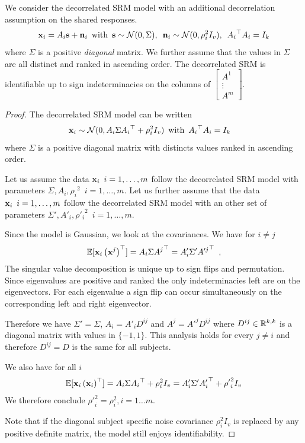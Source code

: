\documentclass[12pt]{report}
\begin{document}
\begin{proposition}
We consider the decorrelated SRM model with an additional decorrelation assumption on the shared responses.
\begin{align*}
\mathbf{x}_i = A_i \mathbf{s} + \mathbf{n}_i \enspace \text{with} \enspace \mathbf{s} \sim \mathcal{N}(0, \Sigma), \enspace\mathbf{n}_i \sim \mathcal{N}(0, \rho_i^2 I_v), \enspace {A_i}^{\top}A_i = I_k
\end{align*}
where $\Sigma$ is a positive \emph{diagonal} matrix. We further assume that the values in $\Sigma$ are all distinct and ranked in ascending order.
The decorrelated SRM is identifiable up to sign indeterminacies on the columns of 
$\begin{bmatrix}
A^1 \\
\vdots \\
A^m
\end{bmatrix}
$.
\end{proposition}
\begin{proof}
The decorrelated SRM model can be written
\begin{align*}
    &\mathbf{x}_i \sim \mathcal{N}(0, A_i \Sigma {A_i}^{\top} + \rho_i^2 I_v) \enspace \text{with}\enspace  {A_i}^{\top}A_i = I_k
\end{align*}
where $\Sigma$ is a positive diagonal matrix with distincts values ranked in ascending order.

Let us assume the data $\mathbf{x}_i \enspace i=1, \dots, m$ follow the decorrelated SRM model with parameters $\Sigma, A_i, {\rho_i}^2 \enspace i=1, \dots, m$. Let us further assume that the data $\mathbf{x}_i \enspace i=1, \dots, m$ follow the decorrelated SRM model with an other set of parameters $\Sigma', A'_i, {\rho'_i}^2 \enspace i=1, \dots, m$.

Since the model is Gaussian, we look at the covariances.
We have for $i \neq j$
\begin{align*}
    \mathbb{E}[\mathbf{x}_i\left(\mathbf{x}^j\right)^{\top}] = A_i\Sigma {A^j}^{\top} = A'_i \Sigma'{A'^j}^{\top} \enspace, 
\end{align*}
The singular value decomposition is unique up to sign flips and permutation. Since eigenvalues are positive and ranked the only indeterminacies left are on the eigenvectors. For each eigenvalue a sign flip can occur simultaneously on the corresponding left and right eigenvector.

Therefore we have $\Sigma' = \Sigma$, $A_i = A'_i D^{ij}$ and $A^j = A'^j D^{ij}$ where $D^{ij} \in \mathbb{R}^{k, k}$ is a diagonal matrix with values in $\{-1, 1\}$. This analysis holds for every $j \neq i$ and therefore $D^{ij} = D$ is the same for all subjects.

We also have for all $i$
\begin{align*}
    \mathbb{E}[\mathbf{x}_i \left(\mathbf{x}_i\right)^{\top}] = A_i \Sigma {A_i}^{\top} + \rho_i^2 I_v =  A'_i \Sigma' {A'_i}^{\top}  + {\rho'}_i^2 I_v\\
\end{align*}
We therefore conclude ${\rho'}_i^2 = \rho_i^2, i=1 \dots m$.

Note that if the diagonal subject specific noise covariance $\rho_i^2 I_v$ is replaced by any positive definite matrix, the model still enjoys identifiability.
\end{proof}
\end{document}
